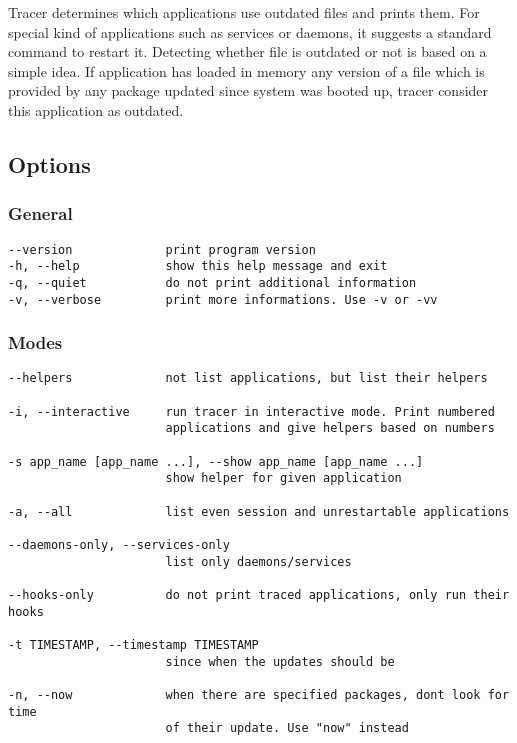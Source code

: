 Tracer determines which applications use outdated files and prints them. For special kind of applications such as services or daemons, it suggests a standard command to restart it. Detecting whether file is outdated or not is based on a simple idea. If application has loaded in memory any version of a file which is provided by any package updated since system was booted up, tracer consider this application as outdated.


\subsection{Options%
  \label{options}%
}


\subsubsection{General%
  \label{general}%
}
%

\begin{lstlisting}
--version             print program version
-h, --help            show this help message and exit
-q, --quiet           do not print additional information
-v, --verbose         print more informations. Use -v or -vv
\end{lstlisting}


\subsubsection{Modes%
  \label{modes}%
}
%

\begin{lstlisting}
--helpers             not list applications, but list their helpers

-i, --interactive     run tracer in interactive mode. Print numbered
                      applications and give helpers based on numbers

-s app_name [app_name ...], --show app_name [app_name ...]
                      show helper for given application

-a, --all             list even session and unrestartable applications

--daemons-only, --services-only
                      list only daemons/services

--hooks-only          do not print traced applications, only run their hooks

-t TIMESTAMP, --timestamp TIMESTAMP
                      since when the updates should be

-n, --now             when there are specified packages, dont look for time
                      of their update. Use "now" instead
\end{lstlisting}


